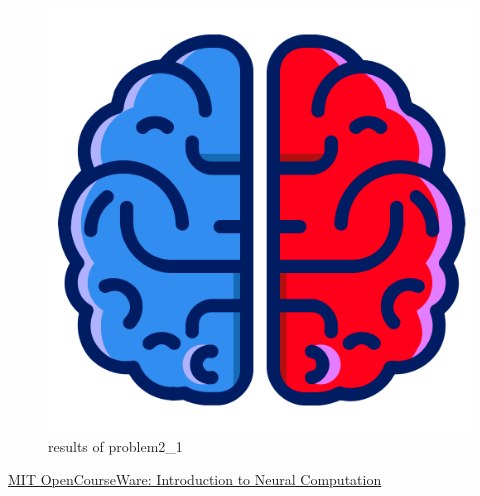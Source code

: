 \documentclass[11pt]{article}
\begin{document}
\begin {figure}[H]
\centering 
\includegraphics[width=17cm]{test.png} 
\caption{results of problem2\_1}
\end {figure}

\begin{thebibliography}{100}
\href{https://ocw.mit.edu/courses/brain-and-cognitive-sciences/9-40-introduction-to-neural-computation-spring-2018/}{MIT OpenCourseWare: Introduction to Neural Computation}
\end{thebibliography}
\end{document}
